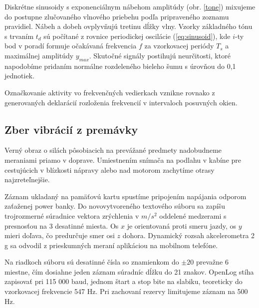 Diskrétne sinusoidy s exponenciálnym nábehom amplitúdy (obr. \ref{tone}) mixujeme do postupne zlučovaného vlnového priebehu
podľa pripraveného zoznamu pravidiel. Nábeh a dobeh ovplyvňujú tretinu dĺžky vlny. Vzorky základného tónu s trvaním $t_d$
sú počítané z rovnice periodickej oscilácie (\ref{eq:sinusoid}), kde $i$-ty bod v poradí formuje očakávaná frekvencia $f$
za vzorkovacej periódy $T_s$ a maximálnej amplitúdy $y_{max}$. Skutočné signály postihujú neurčitosti, ktoré napodobíme
pridaním normálne rozdeleného bieleho šumu s úrovňou do 0,1 jednotiek.

Označkovanie aktivity vo frekvenčných vedierkach vznikne rovnako z generovaných deklarácií rozloženia frekvencií
v intervaloch posuvných okien.

\subsection{Zber vibrácií z premávky}
Verný obraz o silách pôsobiacich na prevážané predmety nadobudneme meraniami priamo v doprave.
Umiestnením snímača na podlahu v kabíne pre cestujúcich v blízkosti nápravy alebo nad motorom zachytíme
otrasy najzreteľnejšie.

Záznam ukladaný na pamäťovú kartu spustíme pripojením napájania odporom zaťaženej power banky.
Do novovytvoreného textového súboru sa zapíšu trojrozmerné súradnice vektora zrýchlenia v $m/s^2$ oddelené medzerami
s presnosťou na 3 desatinné miesta. Os $x$ je orientovaná proti smeru jazdy, os $y$ mieri doľava, čo predurčuje smer
osi $z$ dohora. Dynamický rozsah akcelerometra 2 g sa odvodil z prieskumných meraní aplikáciou na mobilnom telefóne.

Na riadkoch súboru sú desatinné čísla so znamienkom do $\pm 20$ prevažne 6 miestne, čím dosiahne jeden záznam súradníc
dĺžku do 21 znakov. OpenLog stíha zapisovať pri 115 000 baud, jednom štart a stop bite na slabiku, teoreticky do
vzorkovacej frekvencie 547 Hz. Pri zachovaní rezervy limitujeme záznam na 500 Hz.

